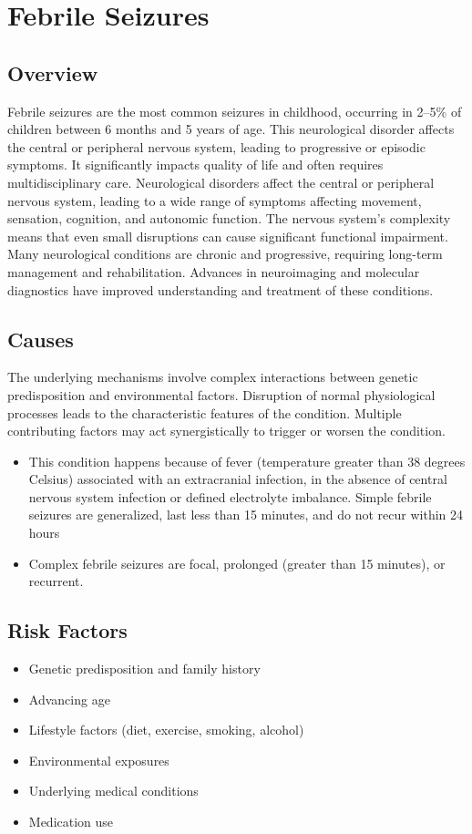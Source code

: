 \chapter{Febrile Seizures}
\label{sec:Febrile Seizures}

\section{Overview}
Febrile seizures are the most common seizures in childhood, occurring in 2--5\% of children between 6 months and 5 years of age. This neurological disorder affects the central or peripheral nervous system, leading to progressive or episodic symptoms. It significantly impacts quality of life and often requires multidisciplinary care. Neurological disorders affect the central or peripheral nervous system, leading to a wide range of symptoms affecting movement, sensation, cognition, and autonomic function. The nervous system's complexity means that even small disruptions can cause significant functional impairment. Many neurological conditions are chronic and progressive, requiring long-term management and rehabilitation. Advances in neuroimaging and molecular diagnostics have improved understanding and treatment of these conditions.
\section{Causes}
The underlying mechanisms involve complex interactions between genetic predisposition and environmental factors. Disruption of normal physiological processes leads to the characteristic features of the condition. Multiple contributing factors may act synergistically to trigger or worsen the condition.

\begin{itemize}[noitemsep]
  \item This condition happens because of fever (temperature greater than 38 degrees Celsius) associated with an extracranial infection, in the absence of central nervous system infection or defined electrolyte imbalance. Simple febrile seizures are generalized, last less than 15 minutes, and do not recur within 24 hours
  \item Complex febrile seizures are focal, prolonged (greater than 15 minutes), or recurrent.
\end{itemize}
\section{Risk Factors}
\begin{itemize}[noitemsep]
  \item Genetic predisposition and family history
  \item Advancing age
  \item Lifestyle factors (diet, exercise, smoking, alcohol)
  \item Environmental exposures
  \item Underlying medical conditions
  \item Medication use
\end{itemize}
